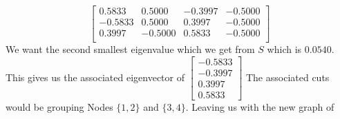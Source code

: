 \documentclass{article}
\begin{document}
\begin{enumerate}
\begin{enumerate}
$$\begin{bmatrix}
 0.5833 &  0.5000 & -0.3997 & -0.5000 \\
-0.5833 &  0.5000 &  0.3997 & -0.5000 \\
 0.3997 & -0.5000 &  0.5833 & -0.5000 \\
\end{bmatrix}$$
\newline
We want the second smallest eigenvalue which we get from $S$ which is $0.0540$.
This gives us the associated eigenvector of $\begin{bmatrix}  -0.5833 \\ -0.3997 \\  0.3997 \\ 0.5833  \end{bmatrix}$
The associated cuts would be grouping Nodes $\{1,2\}$ and $\{3,4\}$.
Leaving us with the new graph of
\newline
\centering
{}

\end{enumerate}
\end{enumerate}

\newpage
\end{document}
